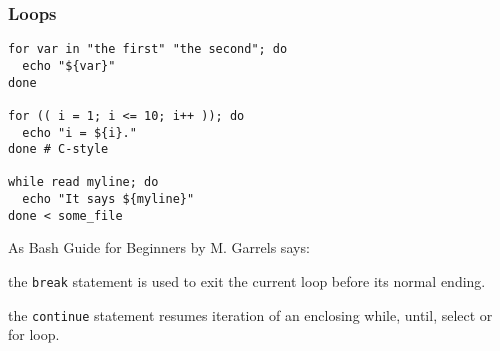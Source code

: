 \subsubsection{Loops}
\begin{verbatim}
for var in "the first" "the second"; do
  echo "${var}"
done

for (( i = 1; i <= 10; i++ )); do
  echo "i = ${i}."
done # C-style

while read myline; do
  echo "It says ${myline}"
done < some_file
\end{verbatim}

As Bash Guide for Beginners by M. Garrels says:
\begin{enumx}
\item the \texttt{break} statement is used to 
exit the current loop before its normal ending. 
\item the \texttt{continue} statement resumes iteration 
of an enclosing while, until, select or for loop.
\end{enumx}




